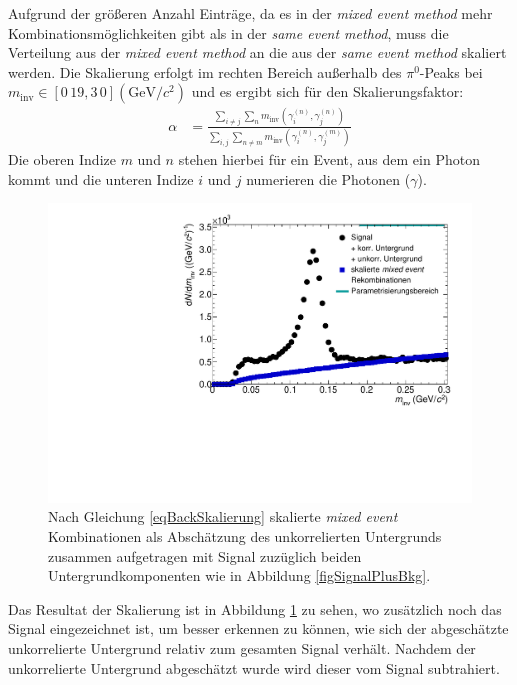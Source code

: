 Aufgrund der größeren Anzahl Einträge, da es in der \textit{mixed event method} mehr Kombinationsmöglichkeiten gibt als in der \textit{same event method}, muss die Verteilung aus der \textit{mixed event method} an die aus der \textit{same event method} skaliert werden.
Die Skalierung erfolgt im rechten Bereich außerhalb des $\pi^{0}$-Peaks bei $m_\text{inv} \in \left[0\,19,3\,0\right] (\text{GeV/}c^{2})$ und es ergibt sich für den Skalierungsfaktor:
\begin{align}
\label{eqBackSkalierung}
\alpha &= \frac{\sum_{i \neq j}\sum_{n}m_{\text{inv}}\left( \gamma^{(n)}_{i},\gamma^{(n)}_{j}\right) }{\sum_{i,j}\sum_{n \neq m}m_{\text{inv}}\left( \gamma^{(n)}_{i},\gamma^{(m)}_{j}\right) }
\end{align}
Die oberen Indize $m$ und $n$ stehen hierbei für ein Event, aus dem ein Photon kommt und die unteren Indize $i$ und $j$ numerieren die Photonen ($\gamma$).
\begin{figure}[tp]
\centering
\includegraphics[width=.75\linewidth]{hUncorrBkgNorm.pdf}
\caption{Nach Gleichung \ref{eqBackSkalierung} skalierte {\it mixed event} Kombinationen als Abschätzung des unkorrelierten Untergrunds zusammen aufgetragen mit Signal zuzüglich beiden Untergrundkomponenten wie in Abbildung \ref{figSignalPlusBkg}.}
\label{figUncorrBkgNorm}
\end{figure}
\newline
Das Resultat der Skalierung ist in Abbildung \ref{figUncorrBkgNorm} zu sehen, wo zusätzlich noch das Signal eingezeichnet ist, um besser erkennen zu können, wie sich der abgeschätzte unkorrelierte Untergrund relativ zum gesamten Signal verhält.
Nachdem der unkorrelierte Untergrund abgeschätzt wurde wird dieser vom Signal subtrahiert.
